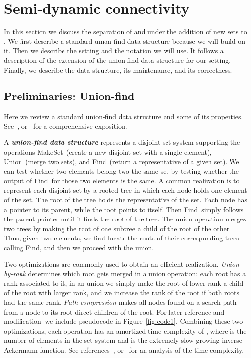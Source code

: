 \documentclass[a4paper,11pt]{article}
\def\find{\mbox{\sc Find}}
\def\union{\mbox{\sc Union}}
\def\makeset{\mbox{\sc MakeSet}}
\def\DEF#1{\textbf{\emph{#1}}}
\begin{document}
\section{Semi-dynamic connectivity}
\label{sec:dynamic}

In this section we discuss the separation of  and  
under the addition of new sets to .
We first describe a standard union-find data structure because we will build on it.
Then we describe the setting and the notation we will use.
It follows a description of the extension of the union-find data structure
for our setting. Finally, we describe the data structure, its maintenance,
and its correctness.


\subsection{Preliminaries: Union-find}

Here we review a standard union-find data structure and some of its properties.
See~\cite[Chapter 21]{cormen}, \cite[Chapter 5]{dpv} or~\cite{e-14} for a comprehensive exposition.

A \DEF{union-find data structure} represents a disjoint set system supporting
the operations \makeset\ (create a new disjoint set with a single element), \union\
(merge two sets), and \find\ (return a representative of a given set). 
We can test whether two elements belong two the same set by testing whether the output
of \find\ for those two elements is the same.
A common realization
is to represent each disjoint set by a rooted tree in which each node holds one element of the set.
The root of the tree holds the representative of the set. Each node has a pointer to its parent,
while the root points to itself.
Then \find\ simply follows the parent pointer until it finds the root of the tree.
The union operation merges two trees by making the root of one subtree a child of the root of the other.
Thus, given two elements, we first locate the roots of their corresponding trees calling \find,
and then we proceed with the union.

Two optimizations are commonly used to obtain an efficient realization. 
\emph{Union-by-rank} determines which root gets merged in a union operation: 
each root has a rank associated to it, in an union we simply make the root of lower rank a child
of the root with larger rank, and we increase the rank of the root if both roots had the same rank. 
\emph{Path compression} makes all nodes found on a search path 
from a node to its root direct children of the root. 
For later reference and modification, 
we include pseudocode in Figure~\ref{fig:code1}.
Combining these two optimizations, each operation has an amortized time
complexity of , where  is the number of elements in the set system and
 is the extremely slow growing inverse Ackermann function.
See references~\cite[Chapter 21]{cormen}, \cite{e-14} or~\cite{ss-05} 
for an analysis of the time complexity.
\end{document}
